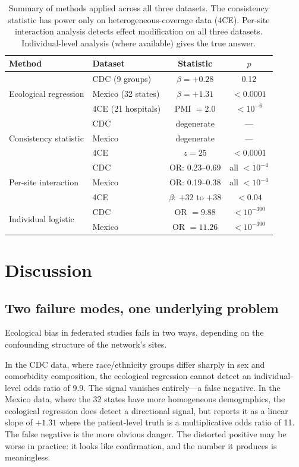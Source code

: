 \documentclass{article}
\begin{document}
\begin{table}[t]
\centering
\caption{Summary of methods applied across all three datasets.  The
consistency statistic has power only on heterogeneous-coverage data (4CE).
Per-site interaction analysis detects effect modification on all three
datasets.  Individual-level analysis (where available) gives the true
answer.}
\label{tab:comparison}
\begin{tabular}{llcc}
\toprule
Method & Dataset & Statistic & $p$ \\
\midrule
\multirow{3}{*}{Ecological regression}
  & CDC (9 groups) & $\beta = +0.28$ & 0.12 \\
  & Mexico (32 states) & $\beta = +1.31$ & $< 0.0001$ \\
  & 4CE (21 hospitals) & PMI $= 2.0$ & $< 10^{-6}$ \\
\midrule
\multirow{3}{*}{Consistency statistic}
  & CDC & degenerate & --- \\
  & Mexico & degenerate & --- \\
  & 4CE & $z = 25$ & $< 0.0001$ \\
\midrule
\multirow{3}{*}{Per-site interaction}
  & CDC & OR: 0.23--0.69 & all $< 10^{-4}$ \\
  & Mexico & OR: 0.19--0.38 & all $< 10^{-4}$ \\
  & 4CE & $\beta$: $+32$ to $+38$ & $< 0.04$ \\
\midrule
\multirow{2}{*}{Individual logistic}
  & CDC & OR $= 9.88$ & $< 10^{-300}$ \\
  & Mexico & OR $= 11.26$ & $< 10^{-300}$ \\
\bottomrule
\end{tabular}
\end{table}


\section{Discussion}

\subsection{Two failure modes, one underlying problem}

Ecological bias in federated studies fails in two ways, depending on the
confounding structure of the network's sites.

In the CDC data, where race/ethnicity groups differ sharply in sex and
comorbidity composition, the ecological regression cannot detect an
individual-level odds ratio of 9.9.  The signal vanishes entirely---a
false negative.  In the Mexico data, where the 32 states have more
homogeneous demographics, the ecological regression does detect a
directional signal, but reports it as a linear slope of $+1.31$ where the
patient-level truth is a multiplicative odds ratio of 11.  The false
negative is the more obvious danger.  The distorted positive may be worse
in practice: it looks like confirmation, and the number it produces is
meaningless.
\end{document}

